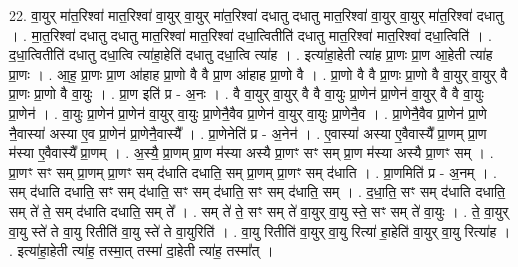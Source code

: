 \documentclass[17pt]{extarticle}
\begin{document}
22. वा॒युर् मा॑त॒रिश्वा॑ मात॒रिश्वा॑ वा॒युर् वा॒युर् मा॑त॒रिश्वा॑ दधातु दधातु मात॒रिश्वा॑ वा॒युर् वा॒युर् मा॑त॒रिश्वा॑ दधातु । . मा॒त॒रिश्वा॑ दधातु दधातु मात॒रिश्वा॑ मात॒रिश्वा॑ दधा॒त्वितीति॑ दधातु मात॒रिश्वा॑ मात॒रिश्वा॑ दधा॒त्विति॑ । . द॒धा॒त्वितीति॑ दधातु दधा॒त्वि त्या॑हा॒हेति॑ दधातु दधा॒त्वि त्या॑ह । . इत्या॑हा॒हेती त्या॑ह प्रा॒णः प्रा॒ण आ॒हेती त्या॑ह प्रा॒णः । . आ॒ह॒ प्रा॒णः प्रा॒ण आ॑हाह प्रा॒णो वै वै प्रा॒ण आ॑हाह प्रा॒णो वै । . प्रा॒णो वै वै प्रा॒णः प्रा॒णो वै वा॒युर् वा॒युर् वै प्रा॒णः प्रा॒णो वै वा॒युः । . प्रा॒ण इति॑ प्र - अ॒नः । . वै वा॒युर् वा॒युर् वै वै वा॒युः प्रा॒णेन॑ प्रा॒णेन॑ वा॒युर् वै वै वा॒युः प्रा॒णेन॑ । . वा॒युः प्रा॒णेन॑ प्रा॒णेन॑ वा॒युर् वा॒युः प्रा॒णेनै॒वैव प्रा॒णेन॑ वा॒युर् वा॒युः प्रा॒णेनै॒व । . प्रा॒णेनै॒वैव प्रा॒णेन॑ प्रा॒णे नै॒वास्या॑ अस्या ए॒व प्रा॒णेन॑ प्रा॒णेनै॒वास्यै᳚ । . प्रा॒णेनेति॑ प्र - अ॒नेन॑ । . ए॒वास्या॑ अस्या ए॒वैवास्यै᳚ प्रा॒णम् प्रा॒ण म॑स्या ए॒वैवास्यै᳚ प्रा॒णम् । . अ॒स्यै॒ प्रा॒णम् प्रा॒ण म॑स्या अस्यै प्रा॒णꣳ सꣳ सम् प्रा॒ण म॑स्या अस्यै प्रा॒णꣳ सम् । . प्रा॒णꣳ सꣳ सम् प्रा॒णम् प्रा॒णꣳ सम् द॑धाति दधाति॒ सम् प्रा॒णम् प्रा॒णꣳ सम् द॑धाति । . प्रा॒णमिति॑ प्र - अ॒नम् । . सम् द॑धाति दधाति॒ सꣳ सम् द॑धाति॒ सꣳ सम् द॑धाति॒ सꣳ सम् द॑धाति॒ सम् । . द॒धा॒ति॒ सꣳ सम् द॑धाति दधाति॒ सम् ते॑ ते॒ सम् द॑धाति दधाति॒ सम् ते᳚ । . सम् ते॑ ते॒ सꣳ सम् ते॑ वा॒युर् वा॒यु स्ते॒ सꣳ सम् ते॑ वा॒युः । . ते॒ वा॒युर् वा॒यु स्ते॑ ते वा॒यु रितीति॑ वा॒यु स्ते॑ ते वा॒युरिति॑ । . वा॒यु रितीति॑ वा॒युर् वा॒यु रित्या॑ हा॒हेति॑ वा॒युर् वा॒यु रित्या॑ह । . इत्या॑हा॒हेती त्या॑ह॒ तस्मा॒त् तस्मा॑ दा॒हेती त्या॑ह॒ तस्मा᳚त् । \newline
\end{document}
